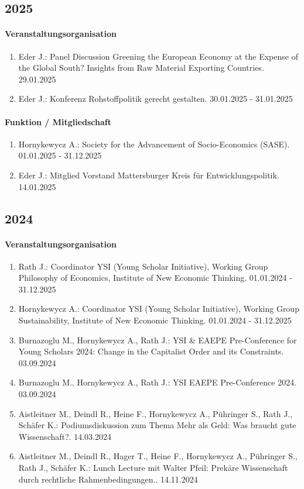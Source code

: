 
\subsection*{2025}
\paragraph{Veranstaltungsorganisation}
\begin{enumerate}[leftmargin=*, labelsep=0.5cm]
\item Eder J.: Panel Discussion \glqq Greening the European Economy at the Expense of the Global South? Insights from Raw Material Exporting Countries\grqq{}. 29.01.2025
\item Eder J.: Konferenz \glqq Rohstoffpolitik gerecht gestalten\grqq{}. 30.01.2025 - 31.01.2025
\end{enumerate}

\paragraph{Funktion / Mitgliedschaft}
\begin{enumerate}[leftmargin=*, labelsep=0.5cm]
\item Hornykewycz A.: Society for the Advancement of Socio-Economics (SASE). 01.01.2025 - 31.12.2025
\item Eder J.: Mitglied Vorstand Mattersburger Kreis für Entwicklungspolitik. 14.01.2025
\end{enumerate}
\subsection*{2024}
\paragraph{Veranstaltungsorganisation}
\begin{enumerate}[leftmargin=*, labelsep=0.5cm]
\item Rath J.: Coordinator YSI (Young Scholar Initiative), Working Group Philosophy of Economics,  Institute of New Economic Thinking. 01.01.2024 - 31.12.2025
\item Hornykewycz A.: Coordinator YSI (Young Scholar Initiative), Working Group Sustainability, Institute of New Economic Thinking. 01.01.2024 - 31.12.2025
\item Burnazoglu M., Hornykewycz A., Rath J.: YSI \& EAEPE Pre-Conference for Young Scholars 2024: Change in the Capitalist Order and its Constraints. 03.09.2024
\item Burnazoglu M., Hornykewycz A., Rath J.: YSI EAEPE Pre-Conference 2024. 03.09.2024
\item Aistleitner M., Deindl R., Heine F., Hornykewycz A., Pühringer S., Rath J., Schäfer K.: Podiumsdiskussion zum Thema \glqq Mehr als Geld: Was braucht gute Wissenschaft?\grqq{}. 14.03.2024
\item Aistleitner M., Deindl R., Hager T., Heine F., Hornykewycz A., Pühringer S., Rath J., Schäfer K.: Lunch Lecture mit Walter Pfeil: Prekäre Wissenschaft durch rechtliche Rahmenbedingungen.. 14.11.2024
\end{enumerate}

